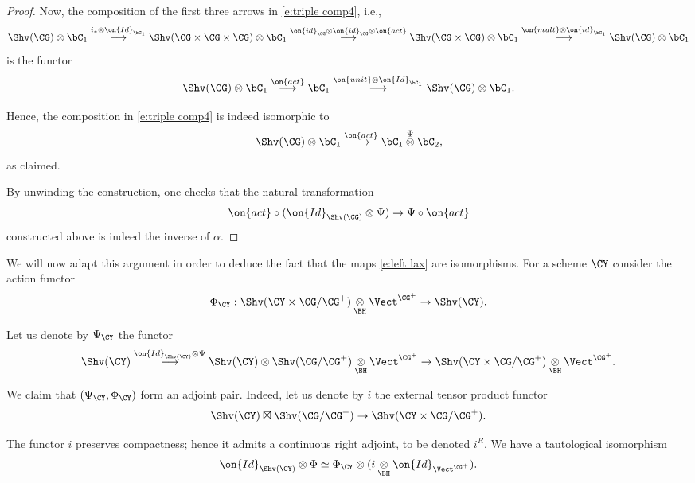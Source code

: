 \documentclass[9pt]{amsart}
\theoremstyle{definition}
\theoremstyle{remark}
\numberwithin{equation}{section}
\begin{document}
\begin{proof}
Now, the composition of the first three arrows in \eqref{e:triple comp4}, i.e.,
$$\Shv(\CG)\otimes \bC_1 \overset{i_*\otimes \on{Id}_{\bC_1}}\longrightarrow \Shv(\CG\times\CG\times \CG)\otimes \bC_1
\overset{\on{id}_\CG\otimes \on{id}_\CG \otimes \on{act}} \longrightarrow 
\Shv(\CG\times \CG)\otimes \bC_1 \overset{{\on{mult}\otimes \on{id}_{\bC_1}}}\longrightarrow \Shv(\CG)\otimes \bC_1$$
is the functor
$$\Shv(\CG)\otimes \bC_1 \overset{\on{act}}\longrightarrow \bC_1 \overset{\on{unit}\otimes \on{Id}_{\bC_1}} \longrightarrow \Shv(\CG)\otimes \bC_1.$$

Hence, the composition in \eqref{e:triple comp4} is indeed isomorphic to 
$$\Shv(\CG)\otimes \bC_1 \overset{\on{act}}\longrightarrow \bC_1 \overset{\Psi}\otimes \bC_2,$$
as claimed. 

\medskip

By unwinding the construction, one checks that the natural transformation
$$\on{act}\circ (\on{Id}_{\Shv(\CG)}\otimes \Psi)\to \Psi\circ \on{act}$$
constructed above is indeed the inverse of $\alpha$. 

\end{proof}

\sssec{} \label{sss:Psi Y}

We will now adapt this argument in order to deduce the fact that the maps \eqref{e:left lax} are isomorphisms. For a scheme $\CY$ 
consider the action functor 
\begin{equation} \label{e:action Y}
\Phi_\CY:\Shv(\CY \times \CG/\CG^+)\underset{\BH}\otimes \Vect^{\CG^+}\to \Shv(\CY). 
\end{equation}

Let us denote by $\Psi_\CY$ the functor 
\begin{equation} \label{e:Psi Y}
\Shv(\CY) \overset{\on{Id}_{\Shv(\CY)}\otimes \Psi}\longrightarrow 
\Shv(\CY)\otimes \Shv(\CG/\CG^+)\underset{\BH}\otimes \Vect^{\CG^+} \to 
\Shv(\CY\times \CG/\CG^+)\underset{\BH}\otimes \Vect^{\CG^+}.
\end{equation}

We claim that $(\Psi_\CY,\Phi_\CY)$ form an adjoint pair.  Indeed, let us denote by $i$ the external tensor product functor
$$\Shv(\CY)\boxtimes \Shv(\CG/\CG^+)\to \Shv(\CY\times \CG/\CG^+).$$

The functor $i$ preserves compactness; hence it admits a continuous right adjoint, to be denoted $i^R$. We have
a tautological isomorphism
$$\on{Id}_{\Shv(\CY)}\otimes \Phi \simeq \Phi_\CY\otimes (i\underset{\BH}\otimes \on{Id}_{\Vect^{\CG^+}}).$$
\end{document}
